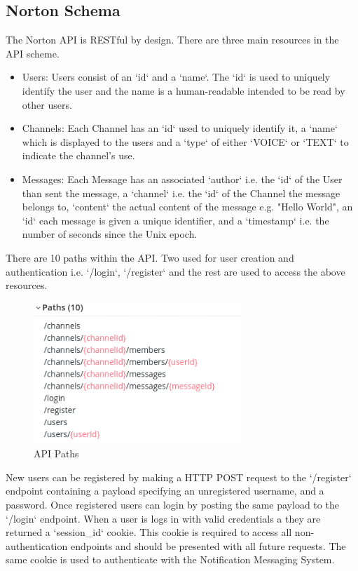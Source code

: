 \subsection{Norton Schema}
The Norton API is RESTful by design. There are three main resources in the API scheme.
\begin{itemize}
\item Users: Users consist of an `id` and a `name`. The `id` is used to uniquely identify the user and the name is a
  human-readable intended to be read by other users.
\item Channels: Each Channel has an `id` used to uniquely identify it, a `name` which is displayed to the users and a `type`
  of either `VOICE` or `TEXT` to indicate the channel's use.
\item Messages: Each Message has an associated `author` i.e. the `id` of the User than sent the message, a `channel` i.e.
  the `id` of the Channel the message belongs to, `content` the actual content of the message e.g. "Hello World", an
  `id` each message is given a unique identifier, and a `timestamp` i.e. the number of seconds since the Unix epoch.
\end{itemize}

There are 10 paths within the API. Two used for user creation and authentication i.e. `/login`, `/register` and the rest
are used to access the above resources.

\begin{figure}[h!]
    \centering
    \includegraphics[width=0.7\textwidth]{images/ApiRoutes.png}
    \caption{API Paths}
    \label{image:models}
\end{figure}

New users can be registered by making a HTTP POST request to the `/register` endpoint containing a payload specifying an
unregistered username, and a password. Once registered users can login by posting the same payload to the `/login`
endpoint. When a user is logs in with valid credentials a they are returned a `session\_id` cookie. This cookie is
required to access all non-authentication endpoints and should be presented with all future requests. The same cookie is
used to authenticate with the Notification Messaging System.

